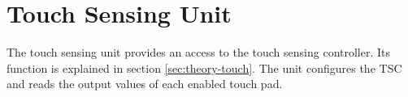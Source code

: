 \section{Touch Sensing Unit}

The touch sensing unit provides an access to the touch sensing controller. Its function is explained in section \ref{sec:theory-touch}. The unit configures the TSC and reads the output values of each enabled touch pad.



